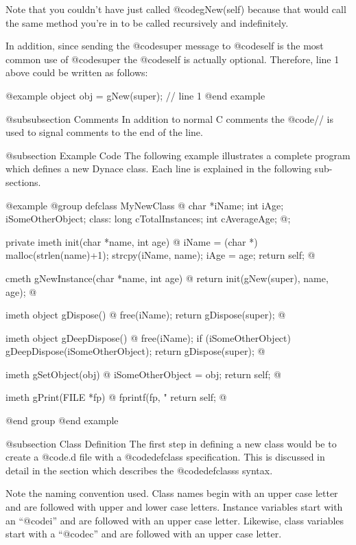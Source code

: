 Note that you couldn't have just called @code{gNew(self)}
because that would call the same method you're in to be called
recursively and indefinitely.

In addition, since sending the @code{super} message to @code{self}
is the most common use of @code{super} the @code{self} is
actually optional.  Therefore, line 1 above could be written as follows:

@example
        object  obj = gNew(super);  // line 1
@end example


@subsubsection Comments
In addition to normal C comments the @code{//} is used to signal comments
to the end of the line.


@subsection Example Code
The following example illustrates a complete program which defines a new
Dynace class.  Each line is explained in the following sub-sections.

@example
@group
defclass  MyNewClass  @{
        char    *iName;
        int     iAge;
        iSomeOtherObject;
 class:
        long    cTotalInstances;
        int     cAverageAge;
@};

private imeth init(char *name, int age)
@{
        iName = (char *) malloc(strlen(name)+1);
        strcpy(iName, name);
        iAge = age;
        return self;
@}

cmeth  gNewInstance(char *name, int age)
@{
        return init(gNew(super), name, age);
@}

imeth   object    gDispose()
@{
        free(iName);
        return gDispose(super);
@}

imeth   object   gDeepDispose()
@{
        free(iName);
        if (iSomeOtherObject)
                gDeepDispose(iSomeOtherObject);
        return gDispose(super);
@}

imeth   gSetObject(obj)
@{
        iSomeOtherObject = obj;
        return self;
@}

imeth   gPrint(FILE *fp)
@{
        fprintf(fp, "%
        return self;
@}

@end group
@end example


@subsection Class Definition
The first step in defining a new class would be to create a @code{.d}
file with a @code{defclass} specification.  This is discussed in
detail in the section which describes the @code{defclasss} syntax.

Note the naming convention used.  Class names begin with an upper case
letter and are followed with upper and lower case letters.  Instance
variables start with an ``@code{i}'' and are followed with an upper case
letter.  Likewise, class variables start with a ``@code{c}'' and are
followed with an upper case letter.


